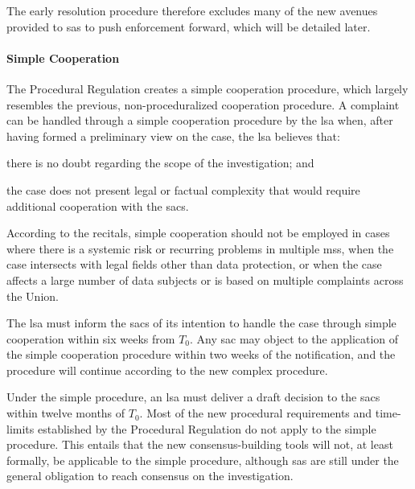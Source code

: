 The early resolution procedure therefore excludes many of the new avenues provided to \glspl{sa} to push enforcement forward, which will be detailed later.

\paragraph{Simple Cooperation} 
The Procedural Regulation creates a simple cooperation procedure, which largely resembles the previous, non-proceduralized cooperation procedure. 
A complaint can be handled through a simple cooperation procedure by the \gls{lsa} when, after having formed a preliminary view on the case, the \gls{lsa} believes that: 
\begin{enumerate*}[label=(\roman*)]
    \item there is no doubt regarding the scope of the investigation; and
    \item the case does not present legal or factual complexity that would require additional cooperation with the \glspl{sac}.
\end{enumerate*}\autocite[6(1)]{ProceduralRegulation}
According to the recitals, simple cooperation should not be employed in cases where there is a systemic risk or recurring problems in multiple \glspl{ms}, when the case intersects with legal fields other than data protection, or when the case affects a large number of data subjects or is based on multiple complaints across the Union.\autocite[recital 26]{ProceduralRegulation}

The \gls{lsa} must inform the \glspl{sac} of its intention to handle the case through simple cooperation within six weeks from $T_0$.\autocite[6(2)]{ProceduralRegulation}
Any \gls{sac} may object to the application of the simple cooperation procedure within two weeks of the notification, and the procedure will continue according to the new complex procedure.\autocite[6(3)]{ProceduralRegulation}

Under the simple procedure, an \gls{lsa} must deliver a draft decision to the \glspl{sac} within twelve months of $T_0$.\autocite[12(6)]{ProceduralRegulation}
Most of the new procedural requirements and time-limits established by the Procedural Regulation do not apply to the simple procedure.\autocite[6(1)]{ProceduralRegulation}
This entails that the new consensus-building tools will not, at least formally, be applicable to the simple procedure, although \glspl{sa} are still under the general obligation to reach consensus on the investigation.\autocites[8]{ProceduralRegulation}[60(1)]{GDPR}

